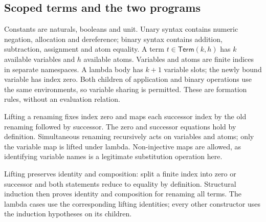 \subsection{Scoped terms and the two programs}

Constants are naturals, booleans and unit. Unary syntax contains numeric
negation, allocation and dereference; binary syntax contains addition,
subtraction, assignment and atom equality. A term $t\in\mathsf{Term}(k,h)$ has
$k$ available variables and $h$ available atoms. Variables and atoms are finite
indices in separate namespaces. A lambda body has $k+1$ variable slots; the
newly bound variable has index zero. Both children of application and binary
operations use the same environments, so variable sharing is permitted.
These are formation rules, without an evaluation relation.





Lifting a renaming fixes index zero and maps each successor index by the old
renaming followed by successor. The zero and successor equations hold by
definition. Simultaneous renaming recursively acts on variables and atoms;
only the variable map is lifted under lambda. Non-injective maps are allowed,
as identifying variable names is a legitimate substitution operation here.





Lifting preserves identity and composition: split a finite index into zero
or successor and both statements reduce to equality by definition. Structural
induction then proves identity and composition for renaming all terms. The
lambda cases use the corresponding lifting identities; every other constructor
uses the induction hypotheses on its children.



